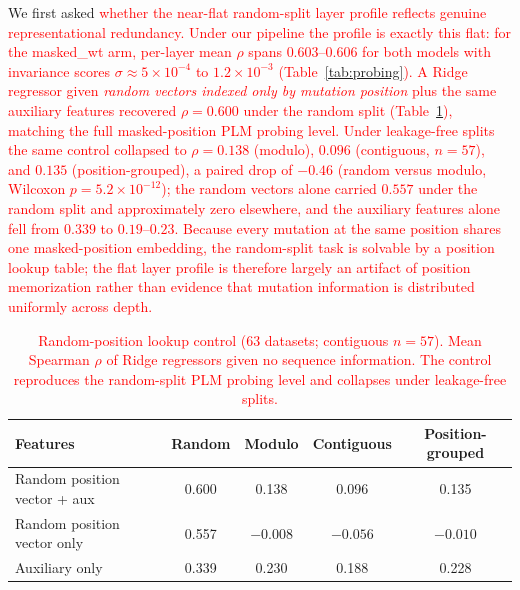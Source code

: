 \documentclass[numbered,webpdf,modern,large]{oup-authoring-template}
\newcommand{\rev}[1]{\textcolor{red}{#1}}
\begin{document}
We first asked \rev{whether the near-flat random-split layer profile reflects
genuine representational redundancy. Under our pipeline the profile is
exactly this flat: for the masked\_wt
arm, per-layer mean $\rho$ spans
$0.603$--$0.606$ for both models with invariance scores $\sigma \approx 5 \times
10^{-4}$ to $1.2 \times 10^{-3}$ (Table~\ref{tab:probing}). A Ridge regressor given
\emph{random vectors indexed only by mutation position} plus the same auxiliary
features recovered $\rho = 0.600$ under the random split (Table~\ref{tab:control}),
matching the full masked-position PLM probing level. Under leakage-free splits the
same control collapsed to $\rho = 0.138$ (modulo), $0.096$ (contiguous, $n=57$), and
$0.135$ (position-grouped), a paired drop of $-0.46$ (random versus modulo, Wilcoxon
$p = 5.2 \times 10^{-12}$); the random vectors alone carried $0.557$ under the random
split and approximately zero elsewhere, and the auxiliary features alone fell from
$0.339$ to $0.19$--$0.23$. Because every mutation at the same position shares one
masked-position embedding, the random-split task is solvable by a position lookup
table; the flat layer profile is therefore largely an artifact of position
memorization rather than evidence that mutation information is distributed uniformly
across depth.}

\begin{table}[ht]
\centering
\caption{\rev{Random-position lookup control (63 datasets; contiguous $n = 57$).
Mean Spearman $\rho$ of Ridge regressors given no sequence information. The control
reproduces the random-split PLM probing level and collapses under leakage-free
splits.}}
\label{tab:control}
\begin{tabular}{lcccc}
\toprule
Features & Random & Modulo & Contiguous & Position-grouped \\
\midrule
Random position vector + aux & 0.600 & 0.138 & 0.096 & 0.135 \\
Random position vector only  & 0.557 & $-0.008$ & $-0.056$ & $-0.010$ \\
Auxiliary only               & 0.339 & 0.230 & 0.188 & 0.228 \\
\bottomrule
\end{tabular}
\end{table}
\end{document}

